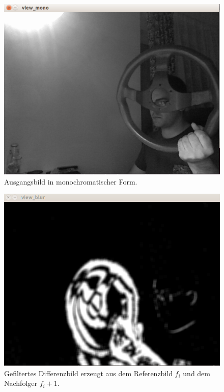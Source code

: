 		\begin{figure}[H]
		\centering
		\includegraphics[width=0.7\linewidth]{../media/image-mono}
		\caption{Ausgangsbild in monochromatischer Form.}
		\label{fig:image-mono}
		\end{figure}
		\begin{figure}[H]
		\centering
		\includegraphics[width=0.7\linewidth]{../media/image-blur}
		\caption{Gefiltertes Differenzbild erzeugt aus dem Referenzbild $f_i$ und dem Nachfolger $f_i+1$.}
		\label{fig:image-diff}
		\end{figure}
		
